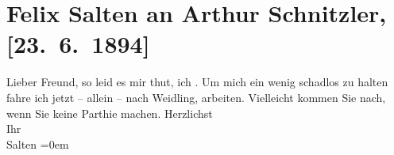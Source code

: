 

         
         \renewcommand{\erwaehntePersonen}{Personen: Felix Salten}
         \renewcommand{\erwaehnteOrte}{Orte: Weidling, Wien}
         \renewcommand{\erwaehnteWerke}{}
               \section[Felix Salten an Arthur Schnitzler, {[}23. 6. 1894{]}]{ Felix Salten an Arthur Schnitzler, {[}23. 6. 1894{]}}\nopagebreak{}\rehead{ }\begin{ledgroupsized}[t]{13cm}\normalsize\beginnumbering{} \toendnotes[C]{\smallbreak\pagebreak[2]} 
\toendnotes[C]{\smallbreak}\pstart
           \noindent{}{\pb}Lieber Freund, so leid es mir thut, ich \label{K_L03137-1v}\label{K_L03137-1h}. Um mich ein wenig schadlos zu halten fahre ich jetzt – allein – nach Weidling, arbeiten. Vielleicht kommen Sie nach,
               wenn Sie {\pb}keine Parthie
               machen.\pend
           \pstart
           Herzlichst {\\[\baselineskip]}Ihr {\\[\baselineskip]}\spacefill\mbox{Salten}\pend
           \leftskip=0em{}
         
         \endnumbering{}\end{ledgroupsized}  \newcommand{\dateiname}{L03137}\newcommand{\titel}{Felix Salten an Arthur Schnitzler, [23. 6. 1894]}\newcommand{\editorInnen}{Martin Anton Müller und Laura Untner}
      
